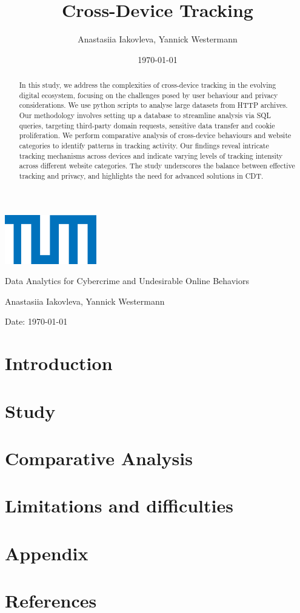 \documentclass{article}
\title{Cross-Device Tracking}
\author{Anastasiia Iakovleva, Yannick Westermann}
\date{\today}
\renewcommand\maketitle{
  \begin{titlepage}
    \centering
    \includegraphics[width=0.3\textwidth]{./assets/tum-logo.png} 
    \vspace{1cm}

    \Large
    Data Analytics for Cybercrime and Undesirable Online Behaviors
    \vspace{2cm}

    \Huge
    \thetitle{}
    \vspace{2cm}

    \Large
    Anastasiia Iakovleva, Yannick Westermann
    \vspace{1cm}

    \normalsize
    Date: \today
    \vspace{1cm}

    \begin{abstract}
      In this study, we address the complexities of cross-device tracking in the evolving digital ecosystem, focusing on the challenges posed by user behaviour and privacy considerations. We use python scripts to analyse large datasets from HTTP archives. Our methodology involves setting up a database to streamline analysis via SQL queries, targeting third-party domain requests, sensitive data transfer and cookie proliferation. We perform comparative analysis of cross-device behaviours and website categories to identify patterns in tracking activity. Our findings reveal intricate tracking mechanisms across devices and indicate varying levels of tracking intensity across different website categories. The study underscores the balance between effective tracking and privacy, and highlights the need for advanced solutions in CDT.
    \end{abstract}
  \end{titlepage}
}
\begin{document}
\maketitle

\newpage
\tableofcontents
\newpage

\section{Introduction}\label{sec:introduction}


\section{Study}\label{sec:methodology}


\section{Comparative Analysis}\label{sec:results}


\section{Limitations and difficulties}\label{sec:conclusion}


\newpage

\section{Appendix}\label{sec:attachments}


\section{References}\label{sec:references}

\end{document}
